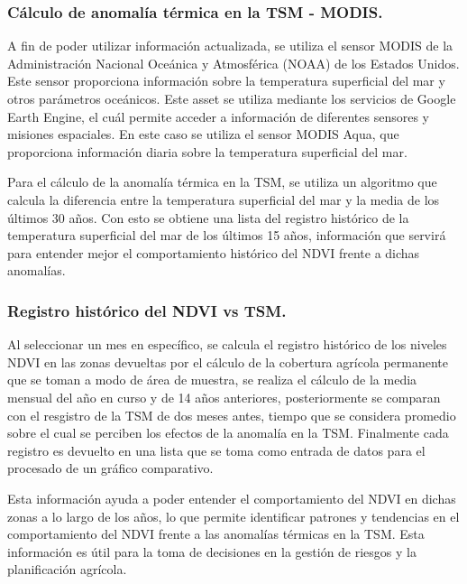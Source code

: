       \subsubsection{\textbf{Cálculo de anomalía térmica en la TSM - MODIS.}}
      
      A fin de poder utilizar información actualizada, se utiliza el sensor MODIS de la Administración Nacional Oceánica y Atmosférica (NOAA) de los Estados Unidos. Este sensor proporciona información sobre la temperatura superficial del mar y otros parámetros oceánicos. Este asset se utiliza mediante los servicios de Google Earth Engine, el cuál permite acceder a información de diferentes sensores y misiones espaciales. En este caso se utiliza el sensor MODIS Aqua, que proporciona información diaria sobre la temperatura superficial del mar.

      Para el cálculo de la anomalía térmica en la TSM, se utiliza un algoritmo que calcula la diferencia entre la temperatura superficial del mar y la media de los últimos 30 años. Con esto se obtiene una lista del registro histórico de la temperatura superficial del mar de los últimos 15 años, información que servirá para entender mejor el comportamiento histórico del NDVI frente a dichas anomalías.

      \subsubsection{\textbf{Registro histórico del NDVI vs TSM.}}
      
      Al seleccionar un mes en específico, se calcula el registro histórico de los niveles NDVI en las zonas devueltas por el cálculo de la cobertura agrícola permanente que se toman a modo de área de muestra, se realiza el cálculo de la media mensual del año en curso y de 14 años anteriores, posteriormente se comparan con el resgistro de la TSM de dos meses antes, tiempo que se considera promedio sobre el cual se perciben los efectos de la anomalía en la TSM. Finalmente cada registro es devuelto en una lista que se toma como entrada de datos para el procesado de un gráfico comparativo.

      Esta información ayuda a poder entender el comportamiento del NDVI en dichas zonas a lo largo de los años, lo que permite identificar patrones y tendencias en el comportamiento del NDVI frente a las anomalías térmicas en la TSM. Esta información es útil para la toma de decisiones en la gestión de riesgos y la planificación agrícola.
      
